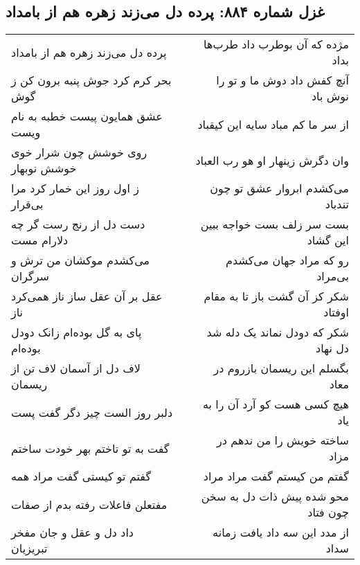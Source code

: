 \begin{center}
\section*{غزل شماره ۸۸۴: پرده دل می‌زند زهره هم از بامداد}
\label{sec:0884}
\begin{longtable}{l p{0.5cm} r}
پرده دل می‌زند زهره هم از بامداد
&&
مژده که آن بوطرب داد طرب‌ها بداد
\\
بحر کرم کرد جوش پنبه برون کن ز گوش
&&
آنچ کفش داد دوش ما و تو را نوش باد
\\
عشق همایون پیست خطبه به نام ویست
&&
از سر ما کم مباد سایه این کیقباد
\\
روی خوشش چون شرار خوی خوشش نوبهار
&&
وان دگرش زینهار او هو رب العباد
\\
ز اول روز این خمار کرد مرا بی‌قرار
&&
می‌کشدم ابروار عشق تو چون تندباد
\\
دست دل از رنج رست گر چه دلارام مست
&&
بست سر زلف بست خواجه ببین این گشاد
\\
می‌کشدم موکشان من ترش و سرگران
&&
رو که مراد جهان می‌کشدم بی‌مراد
\\
عقل بر آن عقل ساز ناز همی‌کرد ناز
&&
شکر کز آن گشت باز تا به مقام اوفتاد
\\
پای به گل بوده‌ام زانک دودل بوده‌ام
&&
شکر که دودل نماند یک دله شد دل نهاد
\\
لاف دل از آسمان لاف تن از ریسمان
&&
بگسلم این ریسمان بازروم در معاد
\\
دلبر روز الست چیز دگر گفت پست
&&
هیچ کسی هست کو آرد آن را به یاد
\\
گفت به تو تاختم بهر خودت ساختم
&&
ساخته خویش را من ندهم در مزاد
\\
گفتم تو کیستی گفت مراد همه
&&
گفتم من کیستم گفت مراد مراد
\\
مفتعلن فاعلات رفته بدم از صفات
&&
محو شده پیش ذات دل به سخن چون فتاد
\\
داد دل و عقل و جان مفخر تبریزیان
&&
از مدد این سه داد یافت زمانه سداد
\\
\end{longtable}
\end{center}
